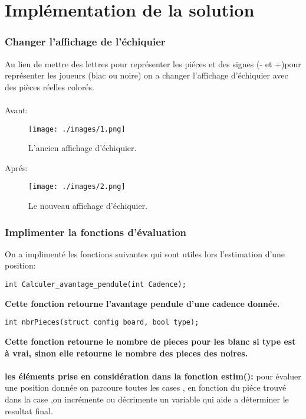 \documentclass[12pt]{report}
\begin{document}
	\chapter{Implémentation de la solution}
	\subsection{Changer l'affichage de l'échiquier}
Au lieu de mettre des lettres pour représenter les piéces et des signes (- et +)pour représenter les joueurs (blac ou noire) on a changer l'affichage d'échiquier avec des pièces réelles colorés.  \\ \\
	Avant:
		\begin{figure}[h!]
		\centering
		\texttt{[image: ./images/1.png]}
		\caption{L'ancien affichage d'échiquier.}	
	\end{figure}
	\FloatBarrier
	\newpage
	Aprés:
		\begin{figure}[h!]
		\centering
		\texttt{[image: ./images/2.png]}
		\caption{Le nouveau affichage d'échiquier.}	
	\end{figure}
	\FloatBarrier
	\subsection{Implimenter la fonctions d'évaluation}
		On a implimenté les fonctions suivantes qui sont utiles lors l'estimation d'une position:
				\lstset{language=C}
				\lstset{basicstyle=\footnotesize}
				\begin{lstlisting}
int Calculer_avantage_pendule(int Cadence);
				\end{lstlisting}
				\textbf{ Cette fonction retourne l'avantage pendule d'une cadence donnée.}
 	     	 \lstset{language=C}
			 \lstset{basicstyle=\footnotesize}
			 \begin{lstlisting}
int nbrPieces(struct config board, bool type);
			 \end{lstlisting}
			 \textbf{Cette fonction retourne le nombre de pieces pour les blanc si type est à vrai, sinon elle retourne le nombre des pieces des noires.}  
\\\\	\textbf{les éléments prise en considération dans la fonction estim():}
pour évaluer une position donnée on parcoure toutes les cases , en fonction du piéce trouvé dans la case ,on incrémente ou décrimente un variable qui aide a déterminer le resultat final.
 
\end{document}
